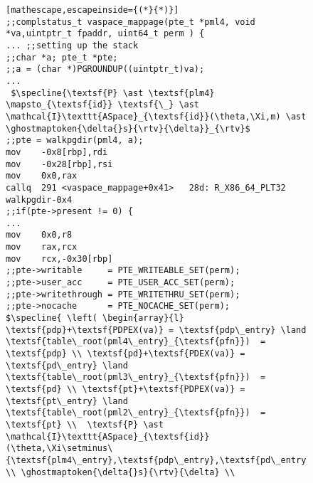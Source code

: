 \begin{figure}\footnotesize
  \begin{lstlisting}[mathescape,escapeinside={(*}{*)}]
;;complstatus_t vaspace_mappage(pte_t *pml4, void *va,uintptr_t fpaddr, uint64_t perm ) {
... ;;setting up the stack      
;;char *a; pte_t *pte;
;;a = (char *)PGROUNDUP((uintptr_t)va);
...
 $\specline{\textsf{P} \ast \textsf{plm4} \mapsto_{\textsf{id}} \textsf{\_} \ast \mathcal{I}\texttt{ASpace}_{\textsf{id}}(\theta,\Xi,m) \ast \ghostmaptoken{\delta{}s}{\rtv}{\delta}}_{\rtv}$      
;;pte = walkpgdir(pml4, a);
mov    -0x8[rbp],rdi
mov    -0x28[rbp],rsi
mov    0x0,rax
callq  291 <vaspace_mappage+0x41>	28d: R_X86_64_PLT32	walkpgdir-0x4
;;if(pte->present != 0) {
...        
mov    0x0,r8
mov    rax,rcx
mov    rcx,-0x30[rbp]
;;pte->writable     = PTE_WRITEABLE_SET(perm);
;;pte->user_acc     = PTE_USER_ACC_SET(perm);
;;pte->writethrough = PTE_WRITETHRU_SET(perm);
;;pte->nocache      = PTE_NOCACHE_SET(perm);
$\specline{ \left( \begin{array}{l} \textsf{pdp}+\textsf{PDPEX(va)} = \textsf{pdp\_entry} \land \textsf{table\_root(pml4\_entry}_{\textsf{pfn}})  = \textsf{pdp} \\ \textsf{pd}+\textsf{PDEX(va)} = \textsf{pd\_entry} \land \textsf{table\_root(pml3\_entry}_{\textsf{pfn}})  = \textsf{pd} \\ \textsf{pt}+\textsf{PDPEX(va)} = \textsf{pt\_entry} \land \textsf{table\_root(pml2\_entry}_{\textsf{pfn}})  = \textsf{pt} \\  \textsf{P} \ast \mathcal{I}\texttt{ASpace}_{\textsf{id}}(\theta,\Xi\setminus\{\textsf{plm4\_entry},\textsf{pdp\_entry},\textsf{pd\_entry},\textsf{pt\_entry}\},m)  \\ \ghostmaptoken{\delta{}s}{\rtv}{\delta} \\

\end{lstlisting}
\end{figure}

